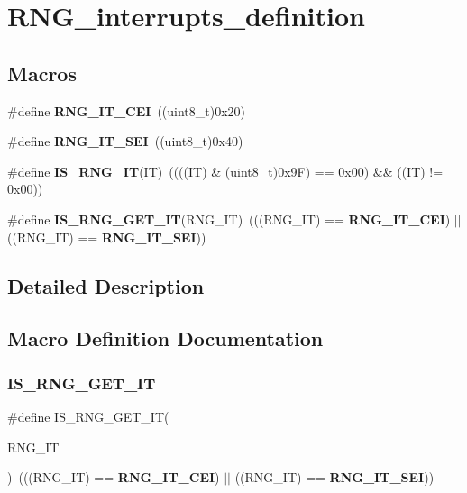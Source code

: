 \section{R\+N\+G\+\_\+interrupts\+\_\+definition}
\label{group__RNG__interrupts__definition}
\subsection*{Macros}
\begin{DoxyCompactItemize}
\item 
\#define \textbf{ R\+N\+G\+\_\+\+I\+T\+\_\+\+C\+EI}~((uint8\+\_\+t)0x20)
\item 
\#define \textbf{ R\+N\+G\+\_\+\+I\+T\+\_\+\+S\+EI}~((uint8\+\_\+t)0x40)
\item 
\#define \textbf{ I\+S\+\_\+\+R\+N\+G\+\_\+\+IT}(IT)~((((IT) \& (uint8\+\_\+t)0x9\+F) == 0x00) \&\& ((\+I\+T) != 0x00))
\item 
\#define \textbf{ I\+S\+\_\+\+R\+N\+G\+\_\+\+G\+E\+T\+\_\+\+IT}(R\+N\+G\+\_\+\+IT)~(((R\+N\+G\+\_\+\+IT) == \textbf{ R\+N\+G\+\_\+\+I\+T\+\_\+\+C\+EI}) $\vert$$\vert$ ((R\+N\+G\+\_\+\+IT) == \textbf{ R\+N\+G\+\_\+\+I\+T\+\_\+\+S\+EI}))
\end{DoxyCompactItemize}


\subsection{Detailed Description}


\subsection{Macro Definition Documentation}
\mbox{\label{group__RNG__interrupts__definition_gafdbf6da44cfc8f3f2be5697a8fdf0595}} 
\subsubsection{I\+S\+\_\+\+R\+N\+G\+\_\+\+G\+E\+T\+\_\+\+IT}
{\footnotesize\ttfamily \#define I\+S\+\_\+\+R\+N\+G\+\_\+\+G\+E\+T\+\_\+\+IT(\begin{DoxyParamCaption}\item[{}]{R\+N\+G\+\_\+\+IT }\end{DoxyParamCaption})~(((R\+N\+G\+\_\+\+IT) == \textbf{ R\+N\+G\+\_\+\+I\+T\+\_\+\+C\+EI}) $\vert$$\vert$ ((R\+N\+G\+\_\+\+IT) == \textbf{ R\+N\+G\+\_\+\+I\+T\+\_\+\+S\+EI}))}



